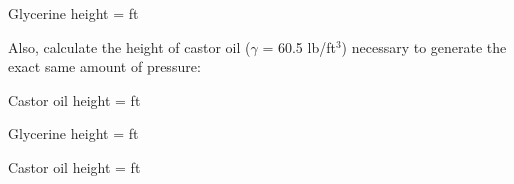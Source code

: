 Glycerine height = \underbar{\hskip 50pt} ft

\vskip 30pt

Also, calculate the height of castor oil ($\gamma$ = 60.5 lb/ft$^{3}$) necessary to generate the exact same amount of pressure:

\vskip 10pt

Castor oil height = \underbar{\hskip 50pt} ft







Glycerine height =  ft

\vskip 10pt

Castor oil height =  ft










